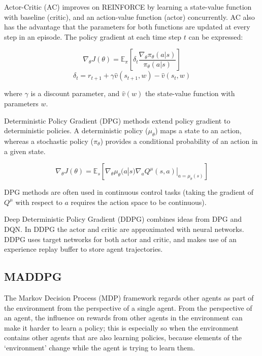 \documentclass[11pt,a4paper]{article}
\begin{document}
Actor-Critic (AC) improves on REINFORCE by learning a state-value function with baseline (critic), and an action-value function (actor) concurrently.
AC also has the advantage that the parameters for both functions are updated at every step in an episode.
The policy gradient at each time step $t$ can be expressed:

\begin{equation}
  \nabla_\theta J(\theta)=\mathbb{E}_\pi\left[\delta_t \frac{\nabla_\theta\pi_\theta(a|s)}{\pi_\theta(a|s)}\right]
\end{equation}
\begin{equation}
  \delta_t = r_{t+1}+\gamma \hat{v}(s_{t+1}, w)-\hat{v}(s_t,w)
\end{equation}

where $\gamma$ is a discount parameter, and $\hat{v}(w)$ the state-value function with parameters $w$.

Deterministic Policy Gradient (DPG) methods extend policy gradient to deterministic policies.
A deterministic policy ($\mu_\theta$) maps a state to an action,
whereas a stochastic policy ($\pi_\theta$) provides a conditional probability of an action in a given state.

\begin{equation}
  \nabla_\theta J(\theta)=\mathbb{E}_s\left[\nabla_\theta \mu_\theta(a|s) \nabla_a Q^\mu(s,a)|_{a=\mu_\theta(s)}\right]
\end{equation}

DPG methods are often used in continuous control tasks
(taking the gradient of $Q^\mu$ with respect to $a$ requires the action space to be continuous).

Deep Deterministic Policy Gradient (DDPG) combines ideas from DPG and DQN.
In DDPG the actor and critic are approximated with neural networks.
DDPG uses target networks for both actor and critic, and makes use of an experience replay buffer to store agent trajectories.

\subsection{MADDPG}

The Markov Decision Process (MDP) framework regards other agents as part of the environment from the perspective of a single agent.
From the perspective of an agent, the influence on rewards from other agents in the environment can make it harder to learn a policy;
this is especially so when the environment contains other agents that are also learning policies,
because elements of the `environment' change while the agent is trying to learn them.
\end{document}

